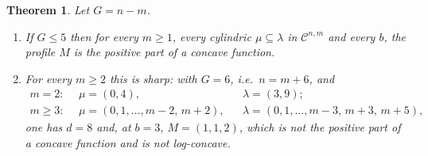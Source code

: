 \documentclass[11pt]{article}
\newtheorem{theorem}{Theorem}
\theoremstyle{definition}
\begin{document}
\begin{theorem}\label{thm:threshold}
Let $G=n-m$.
\begin{enumerate}
\item If $G\le5$ then for every $m\ge1$, every cylindric $\mu\subseteq\lambda$ in
$\mathcal C^{n,m}$ and every $b$, the profile $M$ is the positive part of a concave
function.
\item For every $m\ge2$ this is sharp: with $G=6$, i.e.\ $n=m+6$, and
\[
  \begin{aligned}
  m=2:\ \ &\mu=(0,4), &&\lambda=(3,9);\\
  m\ge3:\ \ &\mu=(0,1,\dots,m-2,\,m+2), &&\lambda=(0,1,\dots,m-3,\,m+3,\,m+5),
  \end{aligned}
\]
one has $d=8$ and, at $b=3$, $M=(1,1,2)$, which is not the positive part of a concave
function and is not log-concave.
\end{enumerate}
\end{theorem}
\end{document}
